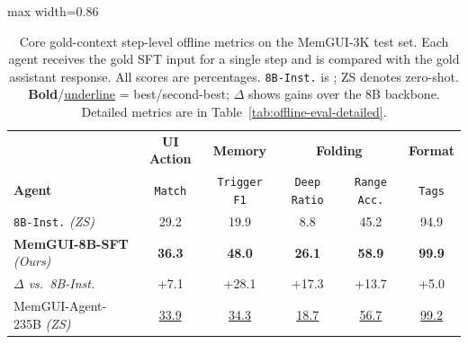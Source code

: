 \documentclass{llmxive}
\providecommand{\llmname}[1]{{\fontfamily{pcr}\selectfont{#1}}}
\providecommand{\ourmethod}{MemGUI-Agent\xspace}
\providecommand{\rise}[1]{#1}
\providecommand{\arraystretch}{1.06}
\begin{document}
\begin{table}[!htbp]
  \centering
  \footnotesize
  \renewcommand{\arraystretch}{1.06}
  \setlength{\tabcolsep}{4pt}
  \begin{adjustbox}{max width=0.86\linewidth}
  \begin{tabular}{@{}l | c | c | cc | c@{}}
    \toprule
    & \textbf{UI Action} & \textbf{Memory} & \multicolumn{2}{c|}{\textbf{Folding}} & \textbf{Format} \\
    \textbf{Agent} & \texttt{Match} & \texttt{Trigger F1} & \texttt{Deep Ratio} & \texttt{Range Acc.} & \texttt{Tags} \\
    \midrule
    \texttt{8B-Inst.} \textit{(ZS)}
      & 29.2 & 19.9 & 8.8 & 45.2 & 94.9 \\
    \addlinespace[2pt]
    \rowcolor{oursrowcolor} \textbf{MemGUI-8B-SFT} \textit{(Ours)}
      & \textbf{36.3} & \textbf{48.0} & \textbf{26.1} & \textbf{58.9} & \textbf{99.9} \\[-2pt]
    \multicolumn{1}{l|}{\quad\textit{\footnotesize $\Delta$ vs.\ 8B-Inst.}}
      & {\footnotesize\rise{+7.1}} & {\footnotesize\rise{+28.1}} & {\footnotesize\rise{+17.3}} & {\footnotesize\rise{+13.7}} & {\footnotesize\rise{+5.0}} \\
    \addlinespace[2pt]
    \ourmethod-235B \textit{(ZS)}
      & \underline{33.9} & \underline{34.3} & \underline{18.7} & \underline{56.7} & \underline{99.2} \\
    \bottomrule
  \end{tabular}%
  \end{adjustbox}
  \caption{Core gold-context step-level offline metrics on the MemGUI-3K test set. Each agent receives the gold SFT input for a single step and is compared with the gold assistant response. All scores are percentages. \texttt{8B-Inst.} is \llmname{Qwen3-VL-8B-Instruct}; ZS denotes zero-shot. \textbf{Bold}/\underline{underline} = best/second-best; $\Delta$ shows gains over the 8B backbone. Detailed metrics are in Table~\ref{tab:offline-eval-detailed}.}
  \label{tab:offline-eval}
\end{table}

\vspace{-0.15em}
\end{document}
